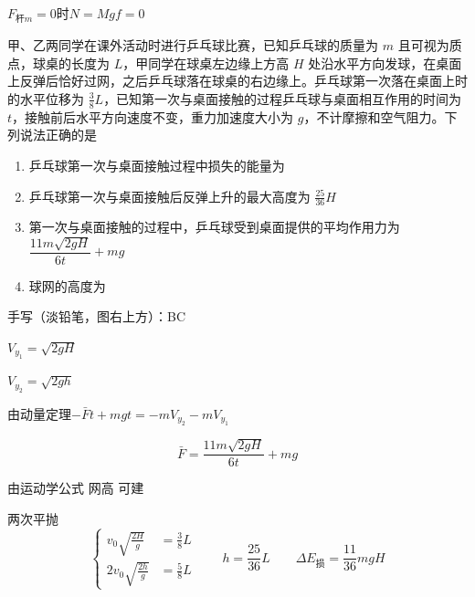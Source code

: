 $F_{\text{杆}m}=0$时\quad $N=Mg$\quad $f=0$
\begin{problem}
甲、乙两同学在课外活动时进行乒乓球比赛，已知乒乓球的质量为 $m$ 且可视为质点，球桌的长度为 $L$，甲同学在球桌左边缘上方高 $H$ 处沿水平方向发球，在桌面上反弹后恰好过网，之后乒乓球落在球桌的右边缘上。乒乓球第一次落在桌面上时的水平位移为 $\frac{3}{8}L$，已知第一次与桌面接触的过程乒乓球与桌面相互作用的时间为 $t$，接触前后水平方向速度不变，重力加速度大小为 $g$，不计摩擦和空气阻力。下列说法正确的是
\begin{enumerate}[label=\Alph*.,leftmargin=2em,itemsep=0pt]
\item 乒乓球第一次与桌面接触过程中损失的能量为  %
\item 乒乓球第一次与桌面接触后反弹上升的最大高度为 $\frac{25}{36}H$
\item 第一次与桌面接触的过程中，乒乓球受到桌面提供的平均作用力为 $\dfrac{11m\sqrt{2gH}}{6t}+mg$
\item 球网的高度为  %
\end{enumerate}
手写（淡铅笔，图右上方）：BC
\begin{solution}
$V_{y_1}=\sqrt{2gH}$

$V_{y_2}=\sqrt{2gh}$

由动量定理\quad $-\bar{F}t+mgt=-mV_{y_2}-mV_{y_1}$

\[
\bar{F}=\frac{11m\sqrt{2gH}}{6t}+mg
\]

由运动学公式 网高 可建

两次平抛
\[
\left\{\begin{aligned}
v_0\sqrt{\frac{2H}{g}}&=\frac{3}{8}L\\
2v_0\sqrt{\frac{2h}{g}}&=\frac{5}{8}L
\end{aligned}\right.
\qquad h=\frac{25}{36}L\qquad \Delta E_{\text{损}}=\frac{11}{36}mgH
\]
\end{solution}
\end{problem}
